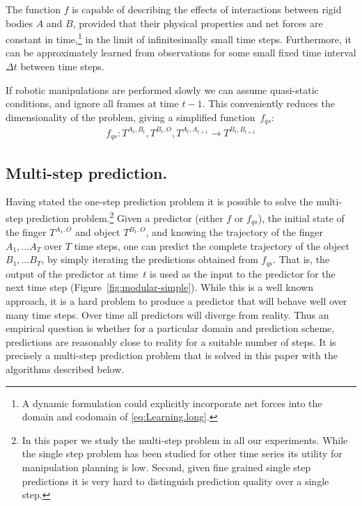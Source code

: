 The function $f$ is capable of describing the effects of interactions between rigid bodies $A$ and $B$, provided that their physical properties and net forces are constant
in time,\footnote{A dynamic formulation could explicitly incorporate
net forces into the domain and codomain of \eqref{eq:Learning.long}.}
in the limit of infinitesimally small time steps.
Furthermore, it can be approximately learned from observations
for some small fixed time interval $\Delta t$ between time steps.

If robotic manipulations are performed slowly we can assume quasi-static conditions, and ignore all frames at time $t-1$.  This conveniently reduces the dimensionality of the problem, giving a simplified function~$f_{qs}$:
\begin{multline}
f_{qs}: T^{A_t, B_t}, T^{B_t, O}, T^{A_{t}, A_{t+1}} \longrightarrow T^{B_{t}, B_{t+1}}
\label{eq:Learning.short}
\end{multline}

\subsection{Multi-step prediction.} Having stated the one-step prediction problem it is possible to solve
the multi-step prediction problem.\footnote{In this paper we study the multi-step problem in all our experiments. While the single step problem has been studied for other time series its utility for manipulation planning is low. Second, given fine grained single step predictions it is very hard to distinguish prediction quality over a single step.} Given a predictor (either $f$ or
$f_{qs}$), the initial state of the finger $T^{A_{1}, O}$ and object
$T^{B_{1}, O}$, and knowing the trajectory of the finger $A_{1},
\ldots A_{T}$ over $T$ time steps, one can predict the complete
trajectory of the object $B_{1}, \ldots B_{T}$, by simply iterating
the predictions obtained from $f_{qs}$.  That is, the output of the
predictor at time~$t$ is used as the input to the predictor for the
next time step (Figure~\ref{fig:modular-simple}). While this is a well known approach, it is a hard problem to produce a predictor that will behave well over many time steps. Over time all predictors will diverge from reality. Thus an empirical question is whether for a particular domain and prediction scheme, predictions are reasonably close to reality for a suitable number of steps. It is precisely a multi-step prediction problem that is solved in this paper with the algorithms described below.

